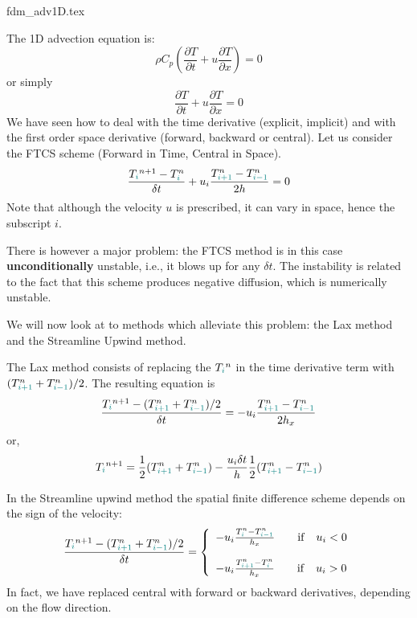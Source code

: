 \begin{flushright} {\tiny {\color{gray} fdm\_adv1D.tex}} \end{flushright}

%


The 1D advection equation is:
\begin{equation}
\rho C_p \left( \frac{\partial T}{\partial t}  
+ u \frac{\partial T}{\partial x} \right)=0 
\end{equation}
or simply
\begin{equation}
\frac{\partial T}{\partial t} + u \frac{\partial T}{\partial x}=0 
\end{equation}
We have seen how to deal with the time derivative (explicit, implicit) 
and with the first order space derivative (forward, backward or central).
Let us consider the FTCS scheme (Forward in Time, Central in Space).
\[
\frac{T_{\color{teal}i}^{n+1}-T^n_{\color{teal}i}}{\delta t} 
+ u_i \frac{T^n_{\color{teal}i+1} - T^n_{{\color{teal}i-1}}}{2h} =0 
\]
Note that although the velocity $u$ is prescribed, it can vary in space, hence
the subscript $i$. 

There is however a major problem: 
the FTCS method is in this case {\bf unconditionally} unstable, i.e., it blows up for any $\delta t$.
The instability is related to the fact that this scheme produces negative diffusion, 
which is numerically unstable.

We will now look at to methods which alleviate this problem: the Lax method and the Streamline Upwind method.

The {\color{olive} Lax method} consists of replacing the $T_{\color{teal}i}^n$ 
in the time derivative term with $(T_{{\color{teal}i+1}}^n + T_{{\color{teal}i-1}}^n)/2$. 
The resulting equation is
\[
\frac{T_{\color{teal}i}^{n+1}-  (T_{{\color{teal}i+1}}^n + T_{{\color{teal}i-1}}^n)/2 }{\delta t} 
= - u_i \frac{T^n_{{\color{teal}i+1}}-T^n_{{\color{teal}i-1}}}{2 h_x}
\]
or, 
\[
T_{\color{teal}i}^{n+1} = \frac{1}{2} (T_{{\color{teal}i+1}}^n + T_{{\color{teal}i-1}}^n)  
- \frac{u_i \delta t}{h}  \frac{1}{2} (T^n_{{\color{teal}i+1}}-T^n_{{\color{teal}i-1}})
\]



In the {\color{olive}Streamline upwind} method the spatial finite difference scheme 
depends on the sign of the velocity:
\[
\frac{T_{\color{teal}i}^{n+1}-  (T_{{\color{teal}i+1}}^n + T_{{\color{teal}i-1}}^n)/2   }{\delta t} =
\left\{
\begin{array}{l}
 - u_i \frac{T^n_{{\color{teal}i}}-T^n_{{\color{teal}i-1}}}{h_x}  \quad\quad  {\rm if} \quad u_i<0\\ \\
 - u_i \frac{T^n_{{\color{teal}i+1}}-T^n_{{\color{teal}i}}}{h_x}  \quad\quad  {\rm if} \quad u_i>0
\end{array}
\right.
\]
In fact, we have replaced central with forward or backward derivatives, depending on the flow direction. 


